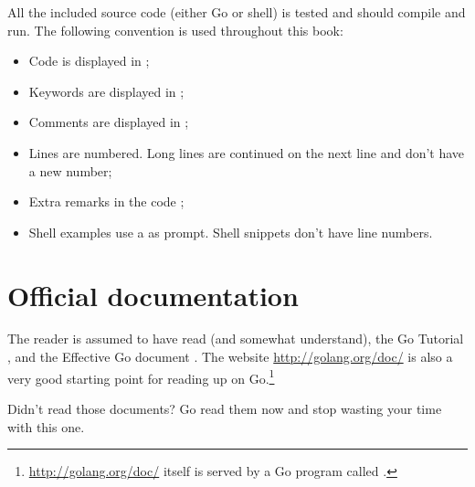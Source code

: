 All the included source code (either Go or shell) is tested
and should compile and run. The following convention is used throughout
this book:
\begin{itemize}
\item Code is displayed in ;
\item Keywords are displayed in ;
\item Comments are displayed in ;
\item Lines are numbered. Long lines are continued on the 
next line and don't have a new number;
\item Extra remarks in the code ;
\item Shell examples use a \pr{} as prompt. Shell snippets don't 
have line numbers.
\end{itemize}

\section{Official documentation}
The reader is assumed to have read (and somewhat understand), the
Go Tutorial \cite{go_tutorial}, and the Effective Go
document \cite{effective_go}. The
website \url{http://golang.org/doc/} is also a very good starting point
for reading up on Go.\footnote{\url{http://golang.org/doc/} itself is served by 
a Go program called .}

\begin{lbar}
\noindent Didn't read those documents? Go read them now and stop wasting your time
with this one.
\end{lbar}

